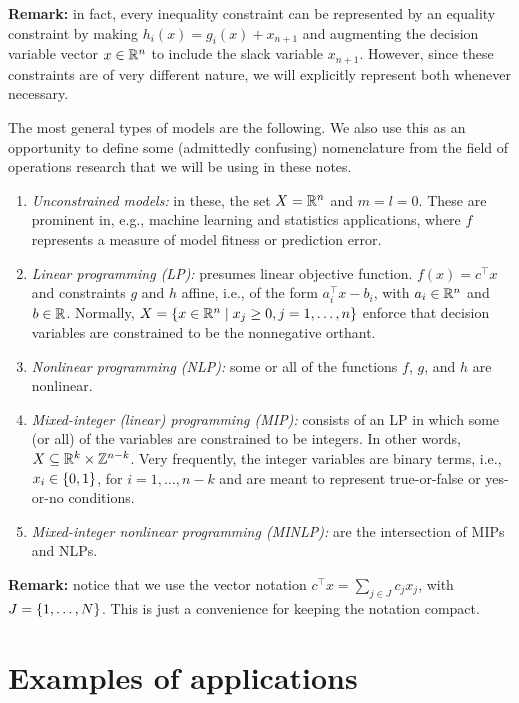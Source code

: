 {\bf Remark:} in fact, every inequality constraint can be represented by an equality constraint by making $h_i(x) = g_i(x) + x_{n+1}$ and augmenting the decision variable vector $x \in \mathbb{R}^n$ to include the slack variable $x_{n+1}$. However, since these constraints are of very different nature, we will explicitly represent both whenever necessary.

The most general types of models are the following. We also use this as an opportunity to define some (admittedly confusing) nomenclature from the field of operations research that we will be using in these notes.
%
\begin{enumerate}
    \item \emph{Unconstrained models:} in these, the set $X = \mathbb{R}^n$ and $m=l=0$. These are prominent in, e.g., machine learning and statistics applications, where $f$ represents a measure of model fitness or prediction error.  
    \item \emph{Linear programming (LP):} presumes linear objective function. $f(x) = c^\top x$ and constraints $g$ and $h$ affine, i.e., of the form $a_i^\top x - b_i$, with $a_i \in \mathbb{R}^n$ and $b \in \mathbb{R}$. Normally, $X = \left\{ x \in \mathbb{R}^n \mid x_j \geq 0, j = 1,\dots, n \right \}$ enforce that decision variables are constrained to be the nonnegative orthant.
    \item \emph{Nonlinear programming (NLP):} some or all of the functions $f$, $g$, and $h$ are nonlinear.
    \item \emph{Mixed-integer (linear) programming (MIP):} consists of an LP in which some (or all) of the variables are constrained to be integers. In other words, $X \subseteq \mathbb{R}^k \times \mathbb{Z}^{n-k}$. Very frequently, the integer variables are binary terms, i.e., $x_i \in \left\{ 0,1 \right \}$, for $i = 1,\dots, n-k$ and are meant to represent true-or-false or yes-or-no conditions.
    \item \emph{Mixed-integer nonlinear programming (MINLP):} are the intersection of MIPs and NLPs.  
\end{enumerate}

{\bf Remark:} notice that we use the vector notation $c^\top x = \sum_{j \in J} c_j x_j$, with $J = \left\{ 1,\dots,N \right \}$. This is just a convenience for keeping the notation compact. 


\section{Examples of applications}


